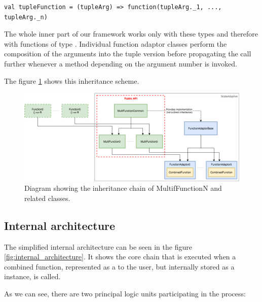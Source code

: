 \lstset{style=Scala}
\begin{lstlisting}
val tupleFunction = (tupleArg) => function(tupleArg._1, ..., tupleArg._n)
\end{lstlisting}
	
The whole inner part of our framework works only with these  types and therefore with functions of type . Individual function adaptor classes perform the composition of the arguments into the tuple version before propagating the call further whenever a method depending on the argument number is invoked.

The figure \ref{fig:inheritance_function_adaptors} shows this inheritance scheme.

\begin{figure}[h!]
	\captionsetup{justification=centering,margin=0.5cm}
	\centerline{\mbox{\includegraphics[width=140mm]{./img/inheritance_function_adaptors.png}}}
	\caption{Diagram showing the inheritance chain of MultifFunctionN and related classes.}
	\label{fig:inheritance_function_adaptors}
\end{figure}

\subsection{Internal architecture}
\label{subsec:internal_architecture}

The simplified internal architecture can be seen in the figure \ref{fig:internal_architecture}. It shows the core chain that is executed when a combined function, represented as a  to the user, but internally stored as a  instance, is called.

As we can see, there are two principal logic units participating in the process:

